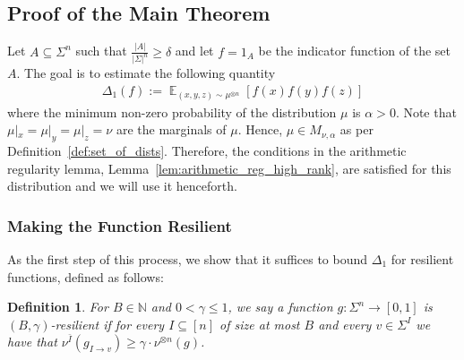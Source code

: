 \documentclass[11pt]{article}
\newtheorem{definition}[thm]{Definition}
\newcommand\Expect[2]{{\mathop{\mathbb{E}}_{#1}\left[ {#2} \right]}}
\renewcommand\geq{\geqslant}
\renewcommand\leq{\leqslant}
\newcommand{\V}[1]{{#1}}
\begin{document}
\subsection{Proof of the Main Theorem}
Let $A\subseteq \Sigma^n$ such that $\frac{|A|}{|\Sigma|^n}\geq \delta$ and let $f=1_A$ be the indicator function of the set $A$. The goal is to estimate the following quantity
\begin{align*}
    \Delta_1(f) := \Expect{(\V x, \V y, \V z)\sim \mu^{\otimes n}}{f(\V x) f(\V y) f(\V z)}
\end{align*}
where the minimum non-zero probability of the distribution $\mu$ is $\alpha>0$. 
Note that $\mu|_{x} = \mu|_{y} = \mu|_{z} = \nu$ are the marginals of $\mu$. Hence, $\mu\in M_{\nu,\alpha}$ as per Definition~\ref{def:set_of_dists}. Therefore, the conditions in the arithmetic regularity lemma, Lemma~\ref{lem:arithmetic_reg_high_rank}, are satisfied for this distribution and we will use it henceforth.




\subsubsection{Making the Function Resilient}

As the first step of this process, we show that it suffices to bound $\Delta_1$ for resilient functions, defined as follows:

\begin{definition}
   For $B\in \mathbb{N}$ and $0< \gamma\leq 1$, we say a function $g\colon \Sigma^n\to [0,1]$ is $(B,\gamma)$-resilient if
    for every $I\subseteq [n]$ of size at most $B$ and 
    every  $v\in \Sigma^{I}$ we have that $\nu^{\bar{I}}(g_{I\rightarrow v})\geq \gamma\cdot \nu^{\otimes n}(g)$.
\end{definition}
\end{document}
